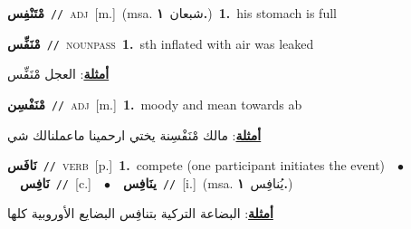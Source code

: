 \documentclass[10pt,a4paper,twoside]{article} %
\begin{document}
\begin{multicols}{2}
{\setlength\topsep{0pt}\textbf{\foreignlanguage{arabic}{مْتَنْفِس}}\ {\color{gray}\texttt{//}\color{black}}\ \textsc{adj}\ [m.]\ \color{gray}(msa. \foreignlanguage{arabic}{شبعان}~\foreignlanguage{arabic}{\textbf{١.}})\color{black}\ \textbf{1.}~his stomach is full\ } \vspace{2mm}

{\setlength\topsep{0pt}\textbf{\foreignlanguage{arabic}{مْنَفِّس}}\ {\color{gray}\texttt{//}\color{black}}\ \textsc{noun\textunderscore pass}\ \textbf{1.}~sth inflated with air was leaked\  \begin{flushright}\color{gray}\foreignlanguage{arabic}{\textbf{\underline{\foreignlanguage{arabic}{أمثلة}}}: العجل مْنَفِّس}\end{flushright}\color{black}} \vspace{2mm}

{\setlength\topsep{0pt}\textbf{\foreignlanguage{arabic}{مْنَفْسِن}}\ {\color{gray}\texttt{//}\color{black}}\ \textsc{adj}\ [m.]\ \textbf{1.}~moody and mean towards ab\  \begin{flushright}\color{gray}\foreignlanguage{arabic}{\textbf{\underline{\foreignlanguage{arabic}{أمثلة}}}: مالك مْنَفْسِنة يختي ارحمينا ماعملنالك شي}\end{flushright}\color{black}} \vspace{2mm}

{\setlength\topsep{0pt}\textbf{\foreignlanguage{arabic}{نَافَس}}\ {\color{gray}\texttt{//}\color{black}}\ \textsc{verb}\ [p.]\ \textbf{1.}~compete (one participant initiates the event)\ \ $\bullet$\ \ \setlength\topsep{0pt}\textbf{\foreignlanguage{arabic}{نَافِس}}\ {\color{gray}\texttt{//}\color{black}}\ [c.]\ \ $\bullet$\ \ \setlength\topsep{0pt}\textbf{\foreignlanguage{arabic}{ينَافِس}}\ {\color{gray}\texttt{//}\color{black}}\ [i.]\ \color{gray}(msa. \foreignlanguage{arabic}{يُنافِس}~\foreignlanguage{arabic}{\textbf{١.}})\color{black}\  \begin{flushright}\color{gray}\foreignlanguage{arabic}{\textbf{\underline{\foreignlanguage{arabic}{أمثلة}}}: البضاعة التركية بتنافِس البضايع الأوروبية كلها}\end{flushright}\color{black}} \vspace{2mm}


\end{multicols}
\end{document}
